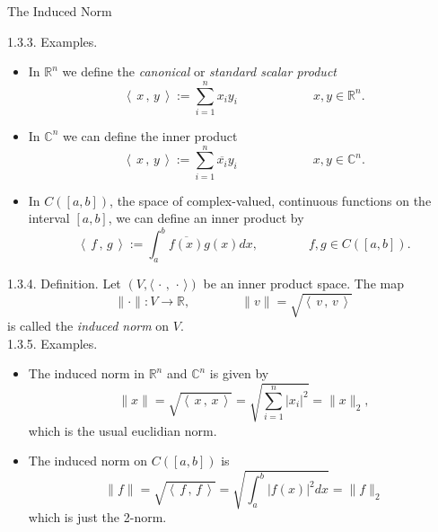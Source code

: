 \documentclass[smaller,hyperref={CJKbookmarks=true}]{beamer}
\newcommand{\C}{\mathbb{C}} \newcommand{\F}{\mathbb{F}} \newcommand{\R}{\mathbb{R}} \newcommand{\Q}{\mathbb{Q}}
\newcommand{\scp}[2]{\left\langle\,#1\,,\,#2\,\right\rangle} \newcommand{\scpp}{\langle\,\cdot\,,\,\cdot\,\rangle}
\begin{document}
\begin{frame}{The Induced Norm} \begin{spacing}{0.8}
\alert{1.3.3. Examples.}\\
\begin{itemize}
  \item In $\R^n$ we define the \emph{canonical} or \emph{standard scalar product} \setcounter{equation}{0}
      \begin{equation}\label{eq5}
        \scp{x}{y}:=\sum_{i=1}^{n}x_iy_i\qquad\qquad
        \qquad x,y\in\R^n.
      \end{equation}
  \item In $\C^n$ we can define the inner product
      \begin{equation*}
        \scp{x}{y}:=\sum_{i=1}^{n}\overline{x_i}y_i\qquad\qquad
        \qquad x,y\in\C^n.
      \end{equation*}
      \vspace*{-4mm}
  \item In $C([a,b])$, the space of complex-valued, continuous functions on the interval $[a,b]$, we can define an inner product by
      \[\scp{f}{g}:=\int_{a}^{b}\overline{f(x)}g(x)dx,\qquad\qquad
      f,g\in C([a,b]).\]
\end{itemize}
\newpage
\alert{1.3.4. Definition.} Let $(V,\scpp)$ be an inner product space. The map
\[\|\cdot\|:V\rightarrow\R,\qquad\qquad\|v\|=\sqrt{\scp{v}{v}}\]
is called the \emph{induced norm} on $V$.\\[1pt]
\alert{1.3.5. Examples.}
\begin{itemize}
  \item The induced norm in $\R^n$ and $\C^n$ is given by
      \begin{equation}\label{eq6}
        \|x\|=\sqrt{\scp{x}{x}}=\sqrt{\sum_{i=1}^{n}|x_i|^2}=\|x\|_2,
      \end{equation}
      which is the usual euclidian norm. \vspace*{-1mm}
  \item The induced norm on $C([a,b])$ is
      \[\|f\|=\sqrt{\scp{f}{f}}=\sqrt{\int_{a}^{b}|f(x)|^2dx}=\|f\|_2\]
      which is just the 2-norm.
\end{itemize}
\end{spacing}
\end{frame}
\end{document}
